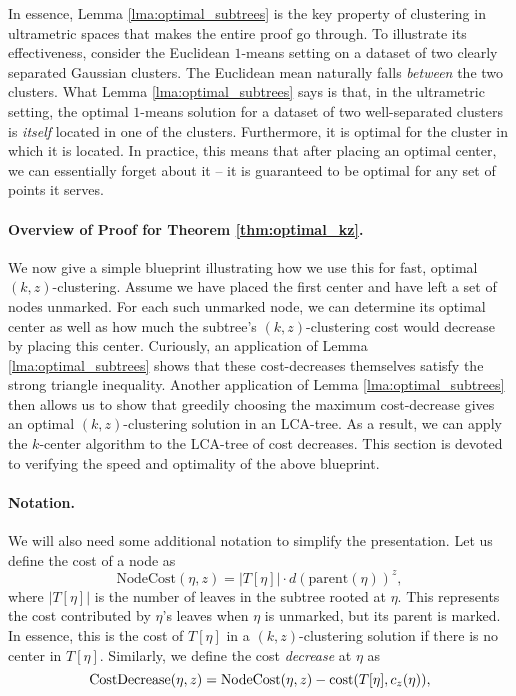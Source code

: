 In essence, Lemma \ref{lma:optimal_subtrees} is the key property of clustering in ultrametric spaces that makes the entire proof go through. To illustrate its effectiveness, consider the Euclidean $1$-means setting on a dataset of two clearly separated Gaussian clusters. The Euclidean mean naturally falls \emph{between} the two clusters. What Lemma \ref{lma:optimal_subtrees} says is that, in the ultrametric setting, the optimal $1$-means solution for a dataset of two well-separated clusters is \emph{itself} located in one of the clusters. Furthermore, it is optimal for the cluster in which it is located. In practice, this means that after placing an optimal center, we can essentially forget about it -- it is guaranteed to be optimal for any set of points it serves.

\paragraph{Overview of Proof for Theorem \ref{thm:optimal_kz}.} We now give a simple blueprint illustrating how we use this for fast, optimal $(k, z)$-clustering. Assume we have placed the first center and have left a set of nodes unmarked. For each such unmarked
node, we can determine its optimal center as well as how much the subtree's $(k, z)$-clustering cost would decrease by placing this center. Curiously, an
application of Lemma \ref{lma:optimal_subtrees} shows that these cost-decreases themselves satisfy the strong triangle inequality.  Another application of Lemma
\ref{lma:optimal_subtrees} then allows us to show that greedily choosing the maximum cost-decrease gives an optimal $(k, z)$-clustering solution in an LCA-tree.
As a result, we can apply the $k$-center algorithm to the LCA-tree of cost decreases. This section is devoted to verifying the speed and optimality of the
above blueprint.

\paragraph{Notation.} We will also need some additional notation to simplify the presentation. Let us define the cost of a node as \[ \text{NodeCost}(\eta, z) = |T[\eta]| \cdot d(\text{parent}(\eta))^z, \] where $|T[\eta]|$ is the number of leaves in the subtree
rooted at $\eta$. This represents the cost contributed by $\eta$'s leaves when $\eta$ is unmarked, but its parent is marked. In essence, this is the cost of
$T[\eta]$ in a $(k, z)$-clustering solution if there is no center in $T[\eta]$.  Similarly, we define the cost \emph{decrease} at $\eta$ as \[ \text{CostDecrease}(\eta, z)
= \text{NodeCost}(\eta, z) - \text{cost}(T[\eta], c_z(\eta)),\]

